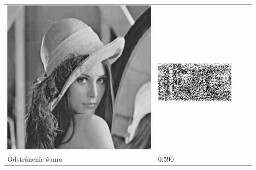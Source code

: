 \begin{table}[h]
\begin{tabular}{llcc}
\begin{minipage}[c]{.1\textwidth}
  \includegraphics[scale=0.1]{obrazky/averageFilter}
\end{minipage} &
\begin{minipage}[c]{.15\textwidth}
\ 
  \includegraphics[scale=0.25]{obrazky/averageFilter-wm}
\end{minipage} \\
Odstránenie šumu                       & 0.590 &
\begin{minipage}[c]{.1\textwidth}
\ 

\end{minipage}
\end{tabular}
\end{table}
